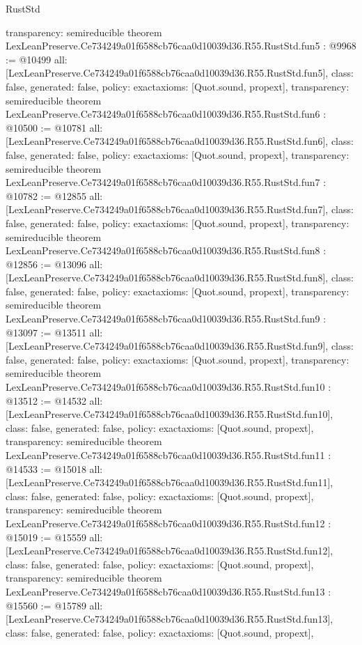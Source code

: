 \begin{lexlean}{RustStd}
\begin{coremodule}
{  transparency: semireducible
}
theorem LexLeanPreserve.Ce734249a01f6588cb76caa0d10039d36.R55.RustStd.fun5 : @9968 := @10499 {
  all: [LexLeanPreserve.Ce734249a01f6588cb76caa0d10039d36.R55.RustStd.fun5],
  class: false,
  generated: false,
  policy: exact{axioms: [Quot.sound, propext]},
  transparency: semireducible
}
theorem LexLeanPreserve.Ce734249a01f6588cb76caa0d10039d36.R55.RustStd.fun6 : @10500 := @10781 {
  all: [LexLeanPreserve.Ce734249a01f6588cb76caa0d10039d36.R55.RustStd.fun6],
  class: false,
  generated: false,
  policy: exact{axioms: [Quot.sound, propext]},
  transparency: semireducible
}
theorem LexLeanPreserve.Ce734249a01f6588cb76caa0d10039d36.R55.RustStd.fun7 : @10782 := @12855 {
  all: [LexLeanPreserve.Ce734249a01f6588cb76caa0d10039d36.R55.RustStd.fun7],
  class: false,
  generated: false,
  policy: exact{axioms: [Quot.sound, propext]},
  transparency: semireducible
}
theorem LexLeanPreserve.Ce734249a01f6588cb76caa0d10039d36.R55.RustStd.fun8 : @12856 := @13096 {
  all: [LexLeanPreserve.Ce734249a01f6588cb76caa0d10039d36.R55.RustStd.fun8],
  class: false,
  generated: false,
  policy: exact{axioms: [Quot.sound, propext]},
  transparency: semireducible
}
theorem LexLeanPreserve.Ce734249a01f6588cb76caa0d10039d36.R55.RustStd.fun9 : @13097 := @13511 {
  all: [LexLeanPreserve.Ce734249a01f6588cb76caa0d10039d36.R55.RustStd.fun9],
  class: false,
  generated: false,
  policy: exact{axioms: [Quot.sound, propext]},
  transparency: semireducible
}
theorem LexLeanPreserve.Ce734249a01f6588cb76caa0d10039d36.R55.RustStd.fun10 : @13512 := @14532 {
  all: [LexLeanPreserve.Ce734249a01f6588cb76caa0d10039d36.R55.RustStd.fun10],
  class: false,
  generated: false,
  policy: exact{axioms: [Quot.sound, propext]},
  transparency: semireducible
}
theorem LexLeanPreserve.Ce734249a01f6588cb76caa0d10039d36.R55.RustStd.fun11 : @14533 := @15018 {
  all: [LexLeanPreserve.Ce734249a01f6588cb76caa0d10039d36.R55.RustStd.fun11],
  class: false,
  generated: false,
  policy: exact{axioms: [Quot.sound, propext]},
  transparency: semireducible
}
theorem LexLeanPreserve.Ce734249a01f6588cb76caa0d10039d36.R55.RustStd.fun12 : @15019 := @15559 {
  all: [LexLeanPreserve.Ce734249a01f6588cb76caa0d10039d36.R55.RustStd.fun12],
  class: false,
  generated: false,
  policy: exact{axioms: [Quot.sound, propext]},
  transparency: semireducible
}
theorem LexLeanPreserve.Ce734249a01f6588cb76caa0d10039d36.R55.RustStd.fun13 : @15560 := @15789 {
  all: [LexLeanPreserve.Ce734249a01f6588cb76caa0d10039d36.R55.RustStd.fun13],
  class: false,
  generated: false,
  policy: exact{axioms: [Quot.sound, propext]},
}
\end{coremodule}
\end{lexlean}
